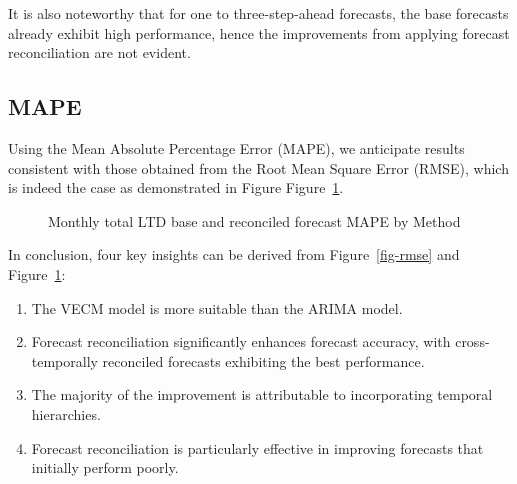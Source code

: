 \documentclass[
  11pt,
  a4paper,
]{article}
\providecommand{\tightlist}{%
  \setlength{\itemsep}{0pt}\setlength{\parskip}{0pt}}\usepackage{longtable,booktabs,array}
\begin{document}
It is also noteworthy that for one to three-step-ahead forecasts, the
base forecasts already exhibit high performance, hence the improvements
from applying forecast reconciliation are not evident.

\subsection{MAPE}\label{mape}

Using the Mean Absolute Percentage Error (MAPE), we anticipate results
consistent with those obtained from the Root Mean Square Error (RMSE),
which is indeed the case as demonstrated in Figure
Figure~\ref{fig-mape}.

\begin{figure}


\caption{\label{fig-mape}Monthly total LTD base and reconciled forecast
MAPE by Method}

\end{figure}%

In conclusion, four key insights can be derived from
Figure~\ref{fig-rmse} and Figure~\ref{fig-mape}:

\begin{enumerate}
\def\labelenumi{\arabic{enumi}.}
\tightlist
\item
  The VECM model is more suitable than the ARIMA model.
\item
  Forecast reconciliation significantly enhances forecast accuracy, with
  cross-temporally reconciled forecasts exhibiting the best performance.
\item
  The majority of the improvement is attributable to incorporating
  temporal hierarchies.
\item
  Forecast reconciliation is particularly effective in improving
  forecasts that initially perform poorly.
\end{enumerate}
\end{document}
